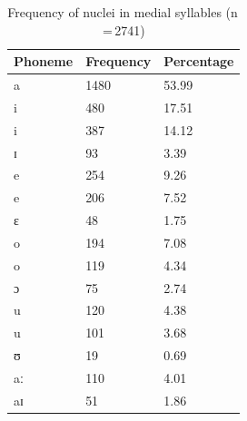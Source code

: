 \begin{table}[pth]\centering
\caption[Frequency of nuclei in medial syllables]{Frequency of nuclei in medial 
syllables (n\,=\,2741)}
\begin{tabu} to 0.5\linewidth{X X[c] X[c]}
\tableheaderfont\toprule
Phoneme
	& Frequency
	& Percentage
	\\
	
\toprule

a
	& 1480
	& 53.99\pct
	\\

\midrule

i
	& 480
	& 17.51\pct
	\\

\rowfont{\scriptsize\itshape}
\raggedleft
i
	& 387
	& 14.12\pct
	\\

\rowfont{\scriptsize\itshape}
\raggedleft
ɪ
	& 93
	& 3.39\pct
	\\

\midrule

e
	& 254
	& 9.26\pct
	\\

\rowfont{\scriptsize\itshape}
\raggedleft
e
	& 206
	& 7.52\pct
	\\

\rowfont{\scriptsize\itshape}
\raggedleft
ɛ
	& 48
	& 1.75\pct
	\\

\midrule

o
	& 194
	& 7.08\pct
	\\

\rowfont{\scriptsize\itshape}
\raggedleft
o
	& 119
	& 4.34\pct
	\\

\rowfont{\scriptsize\itshape}
\raggedleft
ɔ
	& 75
	& 2.74\pct
	\\

\midrule

u
	& 120
	& 4.38\pct
	\\

\rowfont{\scriptsize\itshape}
\raggedleft
u
	& 101
	& 3.68\pct
	\\

\rowfont{\scriptsize\itshape}
\raggedleft
ʊ
	& 19
	& 0.69\pct
	\\

\midrule

aː
	& 110
	& 4.01\pct
	\\

aɪ
	& 51
	& 1.86\pct
	\\


\end{tabu}
\end{table}
